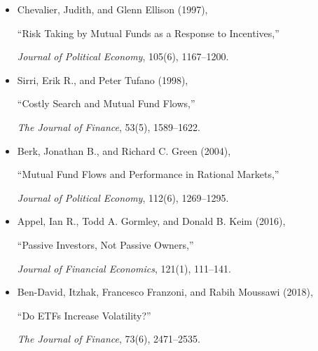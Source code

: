 \begin{itemize}

\item Chevalier, Judith, and Glenn Ellison (1997),

``Risk Taking by Mutual Funds as a Response to Incentives,''

\emph{Journal of Political Economy}, 105(6), 1167--1200.

\item Sirri, Erik R., and Peter Tufano (1998),

``Costly Search and Mutual Fund Flows,''

\emph{The Journal of Finance}, 53(5), 1589--1622.

\item Berk, Jonathan B., and Richard C. Green (2004),

``Mutual Fund Flows and Performance in Rational Markets,''

\emph{Journal of Political Economy}, 112(6), 1269--1295.

\item Appel, Ian R., Todd A. Gormley, and Donald B. Keim (2016),

``Passive Investors, Not Passive Owners,''

\emph{Journal of Financial Economics}, 121(1), 111--141.

\item Ben-David, Itzhak, Francesco Franzoni, and Rabih Moussawi (2018),

``Do ETFs Increase Volatility?''

\emph{The Journal of Finance}, 73(6), 2471--2535.

\end{itemize}

